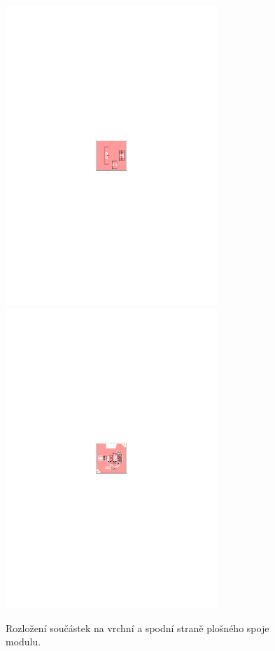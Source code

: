 \documentclass[12pt,a4paper,oneside]{article}
\begin{document}
\begin{figure} [htbp]
  \includegraphics[trim = 85mm 132mm 85mm 132mm, clip, width=8cm]{../../hw/cam_doc/O1.pdf}
  \includegraphics[trim = 85mm 132mm 85mm 132mm, clip, width=8cm]{../../hw/cam_doc/O2.pdf}
  \caption{Rozložení součástek na vrchní a spodní straně plošného spoje modulu.}
\end{figure}
\end{document}

